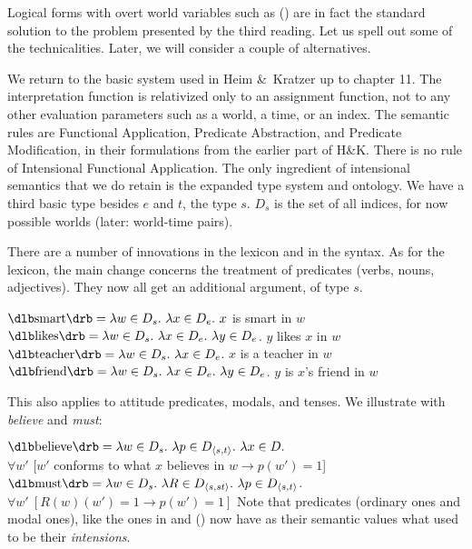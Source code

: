 Logical forms with overt world variables such as (\lastx) are in fact the
standard solution to the problem presented by the third reading. Let us spell
out some of the technicalities. Later, we will consider a couple of
alternatives.

We return to the basic system used in Heim \&\ Kratzer up to chapter 11. The
interpretation function is relativized only to an assignment function, not to
any other evaluation parameters such as a world, a time, or an index. The
semantic rules are Functional Application, Predicate Abstraction, and Predicate
Modification, in their formulations from the earlier part of H\&K. There is
no rule of Intensional Functional Application. The only ingredient of
intensional semantics that we do retain is the expanded type system and
ontology. We have a third basic type besides $e$ and $t$, the type $s$. $D_s$ is
the set of all indices, for now possible worlds (later: world-time pairs).

There are a number of innovations in the lexicon and in the syntax. As for the
lexicon, the main change concerns the treatment of predicates (verbs, nouns,
adjectives). They now all get an additional argument, of type $s$.

\pex\label{124}
\a $\sv{\mbox{smart}} = \lambda w\in D_{s}.\ \lambda x\in D_{e}.\ x$ is smart in $w$ 
\a $\sv{\mbox{likes}} = \lambda w\in D_{s}.\ \lambda x\in D_{e}.\ \lambda y\in D_{e}$. $y$ likes $x$ in $w$ 
\a $\sv{\mbox{teacher}} = \lambda w\in D_{s}.\ \lambda x\in D_{e}$. $x$ is a teacher in $w$ 
\a $\sv{\mbox{friend}} = \lambda w\in D_{s}.\ \lambda x\in D_{e}.\ \lambda y\in D_{e}$. $y$ is $x$'s friend in $w$
\xe

This also applies to attitude predicates, modals, and tenses. We illustrate with
\emph{believe} and \emph{must}:

\pex
\a $\sv{\mbox{believe}} = \lambda w\in D_{s}.\ \lambda p\in D_{\type{s,t}}.\ \lambda x\in D.$ \\
\hfill$\forall w'$ [$w'$ conforms to what $x$ believes in $w \rightarrow p(w') = 1$] 
\a $\sv{\mbox{must}} = \lambda w\in D_{s}.\ \lambda R\in D_{\type{s,st}}.\ \lambda p\in D_{\type{s,t}}$.\\
\hfill$\forall w'\ [R(w)(w') = 1 \rightarrow p(w') = 1]$
\xe
%
Note that predicates (ordinary ones and modal ones), like the ones in 
and (\lastx) now have as their semantic values what used to be their
\emph{intensions}.

